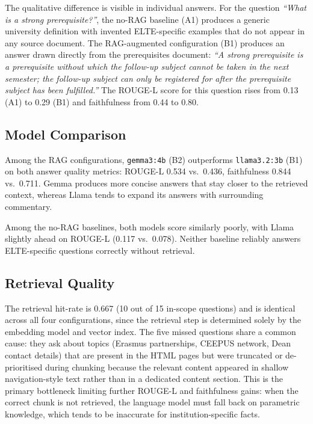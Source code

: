 The qualitative difference is visible in individual answers. For the question \emph{``What is a strong prerequisite?''}, the no-RAG baseline (A1) produces a generic university definition with invented ELTE-specific examples that do not appear in any source document. The RAG-augmented configuration (B1) produces an answer drawn directly from the prerequisites document: \emph{``A strong prerequisite is a prerequisite without which the follow-up subject cannot be taken in the next semester; the follow-up subject can only be registered for after the prerequisite subject has been fulfilled.''} The ROUGE-L score for this question rises from 0.13 (A1) to 0.29 (B1) and faithfulness from 0.44 to 0.80.

\subsection{Model Comparison}

Among the RAG configurations, \texttt{gemma3:4b} (B2) outperforms \texttt{llama3.2:3b} (B1) on both answer quality metrics: ROUGE-L 0.534 vs.\ 0.436, faithfulness 0.844 vs.\ 0.711. Gemma produces more concise answers that stay closer to the retrieved context, whereas Llama tends to expand its answers with surrounding commentary.

Among the no-RAG baselines, both models score similarly poorly, with Llama slightly ahead on ROUGE-L (0.117 vs.\ 0.078). Neither baseline reliably answers ELTE-specific questions correctly without retrieval.

\subsection{Retrieval Quality}

The retrieval hit-rate is 0.667 (10 out of 15 in-scope questions) and is identical across all four configurations, since the retrieval step is determined solely by the embedding model and vector index. The five missed questions share a common cause: they ask about topics (Erasmus partnerships, CEEPUS network, Dean contact details) that are present in the HTML pages but were truncated or de-prioritised during chunking because the relevant content appeared in shallow navigation-style text rather than in a dedicated content section. This is the primary bottleneck limiting further ROUGE-L and faithfulness gains: when the correct chunk is not retrieved, the language model must fall back on parametric knowledge, which tends to be inaccurate for institution-specific facts.

